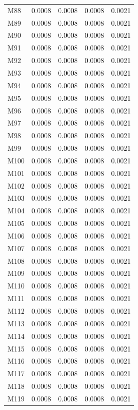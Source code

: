 \begin{longtable}{lrrrr}
M88 & 0.0008 & 0.0008 & 0.0008 & 0.0021 \\
M89 & 0.0008 & 0.0008 & 0.0008 & 0.0021 \\
M90 & 0.0008 & 0.0008 & 0.0008 & 0.0021 \\
M91 & 0.0008 & 0.0008 & 0.0008 & 0.0021 \\
M92 & 0.0008 & 0.0008 & 0.0008 & 0.0021 \\
M93 & 0.0008 & 0.0008 & 0.0008 & 0.0021 \\
M94 & 0.0008 & 0.0008 & 0.0008 & 0.0021 \\
M95 & 0.0008 & 0.0008 & 0.0008 & 0.0021 \\
M96 & 0.0008 & 0.0008 & 0.0008 & 0.0021 \\
M97 & 0.0008 & 0.0008 & 0.0008 & 0.0021 \\
M98 & 0.0008 & 0.0008 & 0.0008 & 0.0021 \\
M99 & 0.0008 & 0.0008 & 0.0008 & 0.0021 \\
M100 & 0.0008 & 0.0008 & 0.0008 & 0.0021 \\
M101 & 0.0008 & 0.0008 & 0.0008 & 0.0021 \\
M102 & 0.0008 & 0.0008 & 0.0008 & 0.0021 \\
M103 & 0.0008 & 0.0008 & 0.0008 & 0.0021 \\
M104 & 0.0008 & 0.0008 & 0.0008 & 0.0021 \\
M105 & 0.0008 & 0.0008 & 0.0008 & 0.0021 \\
M106 & 0.0008 & 0.0008 & 0.0008 & 0.0021 \\
M107 & 0.0008 & 0.0008 & 0.0008 & 0.0021 \\
M108 & 0.0008 & 0.0008 & 0.0008 & 0.0021 \\
M109 & 0.0008 & 0.0008 & 0.0008 & 0.0021 \\
M110 & 0.0008 & 0.0008 & 0.0008 & 0.0021 \\
M111 & 0.0008 & 0.0008 & 0.0008 & 0.0021 \\
M112 & 0.0008 & 0.0008 & 0.0008 & 0.0021 \\
M113 & 0.0008 & 0.0008 & 0.0008 & 0.0021 \\
M114 & 0.0008 & 0.0008 & 0.0008 & 0.0021 \\
M115 & 0.0008 & 0.0008 & 0.0008 & 0.0021 \\
M116 & 0.0008 & 0.0008 & 0.0008 & 0.0021 \\
M117 & 0.0008 & 0.0008 & 0.0008 & 0.0021 \\
M118 & 0.0008 & 0.0008 & 0.0008 & 0.0021 \\
M119 & 0.0008 & 0.0008 & 0.0008 & 0.0021 \\

\end{longtable}
